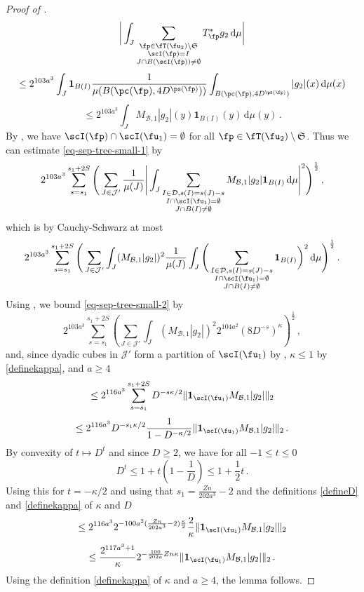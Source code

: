 \begin{proof}[Proof of ]
$$        \bigg| \int_J \sum_{\substack{\fp \in \fT(\fu_2) \setminus \mathfrak{S}\\ \scI(\fp) = I\\
        J \cap B(\scI(\fp)) \ne \emptyset}} T_{\fp}^* g_2 \, \mathrm{d}\mu \bigg|
    $$
    $$
        \le 2^{103a^3} \int_J \mathbf{1}_{B(I)} \frac{1}{\mu(B(\pc(\fp), 4D^{\ps(\fp)}))} \int_{B(\pc(\fp), 4D^{\ps(\fp)})} |g_2|(x) \, \mathrm{d}\mu(x)
    $$
    $$
        \le 2^{103a^3} \int_J M_{\mathcal{B},1} |g_2|(y) \mathbf{1}_{B(I)}(y) \, \mathrm{d}\mu(y)\,.
    $$
    By , we have $\scI(\fp) \cap \scI(\fu_1) = \emptyset$ for all $\fp \in \fT(\fu_2) \setminus \mathfrak{S}$.
    Thus we can estimate \eqref{eq-sep-tree-small-1} by
    $$
        2^{103a^3} \sum_{s = s_1}^{s_1 + 2S} \Bigg( \sum_{J \in \mathcal{J}'} \frac{1}{\mu(J)} \Bigg|\int_J \sum_{\substack{I \in \mathcal{D}, s(I) = s(J) - s\\ I \cap \scI(\fu_1) = \emptyset\\
        J \cap B(I) \ne \emptyset}} M_{\mathcal{B},1} |g_2| \mathbf{1}_{B(I)} \, \mathrm{d}\mu \Bigg|^2\Bigg)^{\frac 1 2}\,,
    $$
    which is by Cauchy-Schwarz at most
    \begin{equation}
    \label{eq-sep-tree-small-2}
        2^{103a^3} \sum_{s = s_1}^{s_1 + 2S} \Bigg( \sum_{J \in \mathcal{J}'} \int_J ( M_{\mathcal{B},1} |g_2|)^2 \frac{1}{\mu(J)} \int_J \Bigg(\sum_{\substack{I \in \mathcal{D}, s(I) = s(J) - s\\ I \cap \scI(\fu_1) = \emptyset\\
        J \cap B(I) \ne \emptyset}} \mathbf{1}_{B(I)}\bigg)^2 \, \mathrm{d}\mu \Bigg)^{\frac 12}\,.
    \end{equation}
    Using , we bound \eqref{eq-sep-tree-small-2} by
    $$
        2^{103a^3} \sum_{s = s_1}^{s_1 + 2S} \left(\sum_{J \in \mathcal{J}'} \int_J (M_{\mathcal{B},1} |g_2|)^2 2^{104a^2} (8 D^{-s})^\kappa\right)^{\frac 1 2}\,,
    $$
    and, since dyadic cubes in $\mathcal{J}'$ form a partition of $\scI(\fu_1)$ by , $\kappa \le 1$ by \eqref{definekappa}, and $a \ge 4$
    $$
        \le 2^{116a^3} \sum_{s = s_1}^{s_1 + 2S} D^{-s\kappa/2} \|\mathbf{1}_{\scI(\fu_1)} M_{\mathcal{B},1} |g_2|\|_2
    $$
    $$
        \le 2^{116a^3} D^{-s_1 \kappa /2} \frac{1}{1 - D^{-\kappa/2}} \|\mathbf{1}_{\scI(\fu_1)} M_{\mathcal{B},1} |g_2|\|_2\,.
    $$
    By convexity of $t \mapsto D^t$ and since $D \ge 2$, we have for all $-1 \le t \le 0$
    $$
        D^t \le 1 + t(1 - \frac{1}{D}) \le 1 + \frac{1}{2}t\,.
    $$
    Using this for $t = -\kappa/2$ and using that $s_1 = \frac{Zn}{202a^3} - 2$ and the definitions \eqref{defineD} and \eqref{definekappa} of $\kappa$ and $D$
    $$
        \le 2^{116a^3} 2^{-100a^2(\frac{Zn}{202a^3} - 2) \frac{\kappa}{2}} \frac{2}{\kappa} \|\mathbf{1}_{\scI(\fu_1)} M_{\mathcal{B},1} |g_2|\|_2
    $$
    $$
        \le \frac{2^{117a^3 + 1}}{\kappa} 2^{-\frac{100}{202a}Zn\kappa} \|\mathbf{1}_{\scI(\fu_1)} M_{\mathcal{B},1} |g_2|\|_2\,.
    $$
    Using the definition \eqref{definekappa} of $\kappa$ and $a \ge 4$, the lemma follows.
\end{proof}



